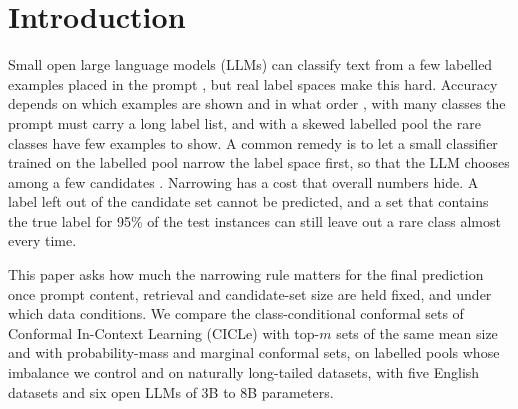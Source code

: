 \section{Introduction}
\label{sec:intro}

Small open large language models (LLMs) can classify text from a few labelled examples placed in the prompt \citep{brown2020language}, but real label spaces make this hard.
Accuracy depends on which examples are shown and in what order \citep{liu2022makes,lu2022fantastically,zhao2021calibrate}, with many classes the prompt must carry a long label list, and with a skewed labelled pool the rare classes have few examples to show.
A common remedy is to let a small classifier trained on the labelled pool narrow the label space first, so that the LLM chooses among a few candidates \citep{milios2023incontext,randl2024cicle}.
Narrowing has a cost that overall numbers hide.
A label left out of the candidate set cannot be predicted, and a set that contains the true label for 95\% of the test instances can still leave out a rare class almost every time.

This paper asks how much the narrowing rule matters for the final prediction once prompt content, retrieval and candidate-set size are held fixed, and under which data conditions.
We compare the class-conditional conformal sets of Conformal In-Context Learning (CICLe) \citep{randl2024cicle} with top-$m$ sets of the same mean size and with probability-mass and marginal conformal sets, on labelled pools whose imbalance we control and on naturally long-tailed datasets, with five English datasets and six open LLMs of 3B to 8B parameters. %

